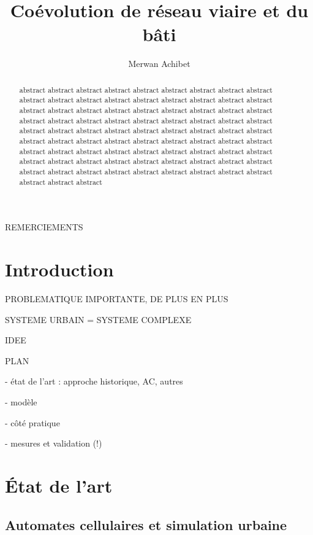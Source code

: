 \documentclass[10pt]{article}
\title{Coévolution de réseau viaire et du bâti}
\author{Merwan Achibet}
\date{}
\begin{document}
\maketitle

\begin{abstract}
abstract abstract abstract abstract abstract abstract abstract
abstract abstract abstract abstract abstract abstract abstract
abstract abstract abstract abstract abstract abstract abstract
abstract abstract abstract abstract abstract abstract abstract
abstract abstract abstract abstract abstract abstract abstract
abstract abstract abstract abstract abstract abstract abstract
abstract abstract abstract abstract abstract abstract abstract
abstract abstract abstract abstract abstract abstract abstract
abstract abstract abstract abstract abstract abstract abstract
abstract abstract abstract abstract abstract abstract abstract
abstract abstract abstract abstract abstract abstract abstract
abstract abstract abstract abstract abstract abstract abstract
\end{abstract}

\newpage

\tableofcontents

\newpage

REMERCIEMENTS

\newpage

\section{Introduction}

PROBLEMATIQUE IMPORTANTE, DE PLUS EN PLUS

SYSTEME URBAIN = SYSTEME COMPLEXE

IDEE

PLAN

- état de l'art : approche historique, AC, autres

- modèle

- côté pratique

- mesures et validation (!)

\section{\'Etat de l'art}

\subsection{Automates cellulaires et simulation urbaine}
\end{document}
